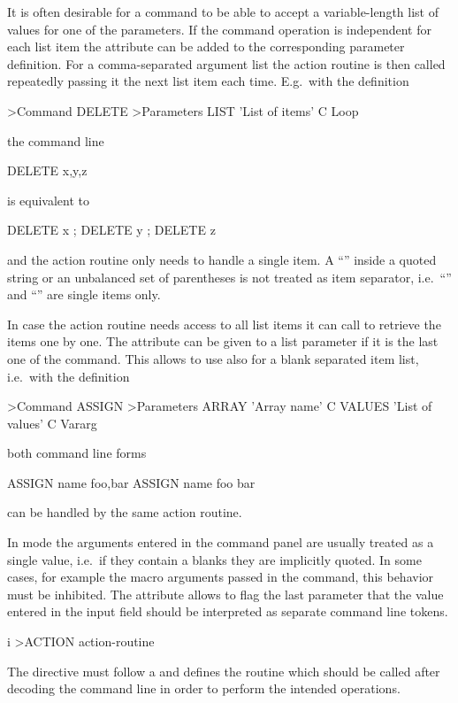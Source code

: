 It is often desirable for a command to be able to accept a
variable-length list of values for one of the parameters.
If the command operation is independent for each list item
the  attribute can be added to the corresponding parameter
definition.
For a comma-separated argument list the action routine is then called
repeatedly passing it the next list item each time.
E.g.\ with the definition
\condbreak{1cm}
\begin{XMP}
>Command DELETE
>Parameters
LIST  'List of items'  C \quad Loop
\end{XMP}
the command line
\begin{XMP}
DELETE x,y,z
\end{XMP}
is equivalent to
\begin{XMP}
DELETE x ;  DELETE y ;  DELETE z
\end{XMP}
and the action routine only needs to handle a single item.
A ``\Lit{,}'' inside a quoted string or an unbalanced set of
parentheses is not treated as item separator, i.e.\ ``''
and ``'' are single items only.

In case the action routine needs access to all list items it can call
 to retrieve the items one by one.
The  attribute can be given to a list parameter if it is
the last one of the command. 
This allows to use  also for a blank separated item list,
i.e.\ with the definition
\begin{XMP}
>Command ASSIGN 
>Parameters 
ARRAY  'Array name'  C 
VALUES  'List of values'  C  Vararg
\end{XMP}
both command line forms
\begin{XMP}
ASSIGN  name  foo,bar 
ASSIGN  name  foo  bar
\end{XMP}
can be handled by the same action routine.

In \Motif{} mode the arguments entered in the command panel are usually
treated as a single value, i.e.\ if they contain a blanks they are
implicitly quoted.
In some cases, for example the macro arguments passed in the
 command, this behavior must be inhibited.
The  attribute allows to flag the last parameter that
the value entered in the \Motif{} input field should be interpreted as
separate command line tokens.


\begin{Gray}{i}
>ACTION  action-routine
\end{Gray}
The  directive must follow a  and defines
the routine which should be called after decoding the command line in
order to perform the intended operations.

